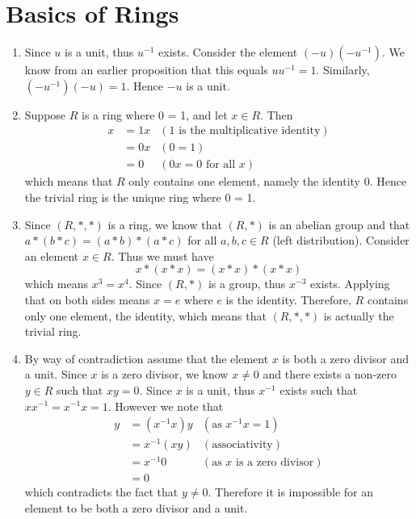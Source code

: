 \section{Basics of Rings}
\begin{enumerate}
    \item Since $u$ is a unit, thus $u^{-1}$ exists. Consider the element $(-u)(-u^{-1})$. We know from an earlier proposition that this equals $uu^{-1} = 1$. Similarly, $(-u^{-1})(-u) = 1$. Hence $-u$ is a unit.

    \item Suppose $R$ is a ring where 0 = 1, and let $x \in R$. Then
    \begin{align*}
        x &= 1x & (1 \text{ is the multiplicative identity})\\
        &= 0x & (0 = 1)\\
        &= 0 & (0x = 0 \text{ for all }x)
    \end{align*}
    which means that $R$ only contains one element, namely the identity 0. Hence the trivial ring is the unique ring where 0 = 1.

    \item Since $(R, \ast, \ast)$ is a ring, we know that $(R, \ast)$ is an abelian group and that $a \ast(b\ast c) = (a \ast b) \ast (a \ast c)$ for all $a, b, c \in R$ (left distribution). Consider an element $x \in R$. Thus we must have
    \[
        x \ast (x \ast x) = (x \ast x) \ast (x \ast x)    
    \]
    which means $x^3 = x^4$. Since $(R, \ast)$ is a group, thus $x^{-3}$ exists. Applying that on both sides means $x = e$ where $e$ is the identity. Therefore, $R$ contains only one element, the identity, which means that $(R, \ast, \ast)$ is actually the trivial ring.

    \item By way of contradiction assume that the element $x$ is both a zero divisor and a unit. Since $x$ is a zero divisor, we know $x \neq 0$ and there exists a non-zero $y \in R$ such that $xy = 0$. Since $x$ is a unit, thus $x^{-1}$ exists such that $xx^{-1} = x^{-1}x = 1$. However we note that
    \begin{align*}
        y &= (x^{-1}x)y & (\text{as }x^{-1}x = 1)\\
        &= x^{-1}(xy) & (\text{associativity})\\
        &= x^{-1}0 & (\text{as }x \text{ is a zero divisor})\\
        &= 0
    \end{align*}
    which contradicts the fact that $y \neq 0$. Therefore it is impossible for an element to be both a zero divisor and a unit.


\end{enumerate}
